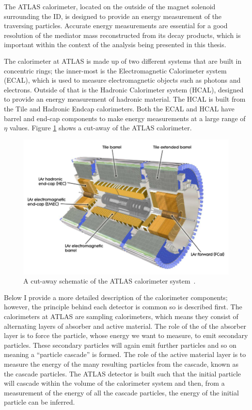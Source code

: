 The ATLAS calorimeter, located on the outside of the magnet solenoid surrounding the ID,
is designed to provide an energy measurement of the traversing particles.
Accurate energy measurements are essential for a good resolution
of the mediator mass reconstructed from its decay products,
which is important within the context of the analysis being presented in this thesis.

The calorimeter at ATLAS is made up of two different systems that are built in concentric rings;
the inner-most is the Electromagnetic Calorimeter system (ECAL), which is used to measure electromagnetic objects such as photons and electrons.
Outside of that is the Hadronic Calorimeter system (HCAL), designed to provide an energy measurement of hadronic material.
The HCAL is built from the Tile and Hadronic Endcap calorimeters.
Both the ECAL and HCAL have barrel and end-cap components to make energy measurements at a large range of $\eta$ values.
Figure \ref{fig:det-calo_schem} shows a cut-away of the ATLAS calorimeter.

\begin{figure}[!ht]
  \begin{center}
    \includegraphics[width=1\linewidth, angle=0]{figs/Detector/Calo_schem.png}
  \end{center}
  \caption[A cut-away schematic of the ATLAS calorimeter system.]
          {A cut-away schematic of the ATLAS calorimeter system~\cite{det-ATLAS_Exp}.}
  \label{fig:det-calo_schem}
\end{figure}

Below I provide a more detailed description of the calorimeter components;
however, the principle behind each detector is common so is described first.
The calorimeters at ATLAS are sampling calorimeters, which means they consist of alternating layers of absorber and active material.
The role of the of the absorber layer is to force the particle, whose energy we want to measure, to emit secondary particles.
These secondary particles will again emit further particles and so on meaning a ``particle cascade'' is formed.
The role of the active material layer is to measure the energy of the many resulting particles from the cascade, known as the cascade particles.
The ATLAS detector is built such that the initial particle will cascade within the volume of the calorimeter system
and then, from a measurement of the energy of all the cascade particles,
the energy of the initial particle can be inferred. 

